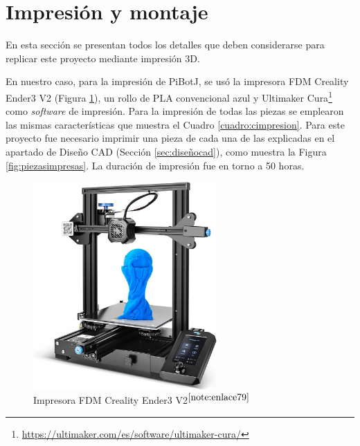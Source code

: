\section{Impresión y montaje}
\label{sec:impresionmontaje}

En esta sección se presentan todos los detalles que deben considerarse para replicar este proyecto mediante impresión 3D. 

En nuestro caso, para la impresión de PiBotJ, se usó la impresora FDM Creality Ender3 V2 (Figura \ref{fig:impresora}), un rollo de PLA convencional azul y Ultimaker Cura\footnote{\url{https://ultimaker.com/es/software/ultimaker-cura/}} como \textit{software} de impresión. Para la impresión de todas las piezas se emplearon las mismas características que muestra el Cuadro \ref{cuadro:cimpresion}. Para este proyecto fue necesario imprimir una pieza de cada una de las explicadas en el apartado de Diseño CAD (Sección \ref{sec:diseñocad}), como muestra la Figura \ref{fig:piezasimpresas}. La duración de impresión fue en torno a 50 horas.
 
\begin{figure} [h!]
	\begin{center}
		\includegraphics[width=7cm]{figs/cap5/impresora.jpg}
	\end{center}
	\caption{Impresora FDM Creality Ender3 V2$^{\ref{note:enlace79}}$} 
	\label{fig:impresora}
\end{figure}

\setcounter{footnote}{79} %

